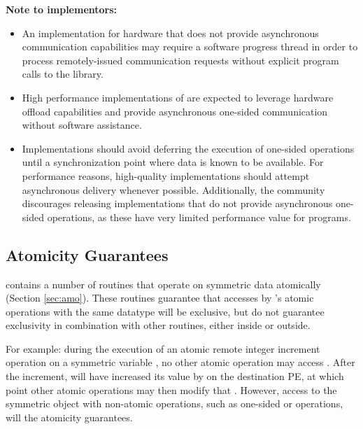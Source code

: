 \textbf{Note to implementors:}
\begin{itemize}
  \item An \openshmem implementation for hardware that does not provide
      asynchronous communication capabilities may require a software progress
      thread in order to process remotely-issued communication requests without
      explicit program calls to the \openshmem library.  
  \item High performance implementations of \openshmem are expected to leverage
      hardware offload capabilities and provide asynchronous one-sided
      communication without software assistance.
  \item Implementations should avoid deferring the execution of one-sided
      operations until a synchronization point where data is known to be
      available. For performance reasons, high-quality implementations should 
      attempt asynchronous delivery whenever possible. Additionally, the \openshmem
      community discourages releasing \openshmem implementations that do not
      provide asynchronous one-sided operations, as these have very limited
      performance value for \openshmem programs.
\end{itemize}

\subsection{Atomicity Guarantees}\label{subsec:amo_guarantees}

\openshmem contains a number of routines that operate on symmetric data
atomically (Section \ref{sec:amo}).  These routines guarantee that accesses by
\openshmem's atomic operations with the same datatype will be exclusive, but do not guarantee
exclusivity in combination with other routines, either inside \openshmem or
outside.

For example: during the execution of an atomic remote integer increment
operation on a symmetric variable , no other \openshmem atomic operation
may access .  After the increment,  will have increased its value
by  on the destination \ac{PE}, at which point other atomic operations
may then modify that .  However, access to the symmetric object 
with non-atomic operations, such as one-sided  or  operations,
will  the atomicity guarantees.
